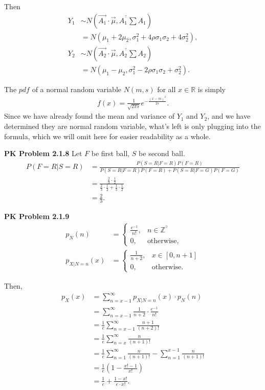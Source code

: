 \documentclass{article}
\begin{document}
Then 
\begin{align}
    Y_1 & \sim N(\vec{A_1}\cdot\vec{\mu}, A_1^{^\top}\sum A_1) \nonumber \\
    & = N(\mu_1+2\mu_2, \sigma_1^2+4\rho\sigma_1\sigma_2+4\sigma_2^2), \nonumber \\
    Y_2 & \sim N(\vec{A_2}\cdot\vec{\mu}, A_2^{^\top}\sum A_2) \nonumber \\
    & = N(\mu_1-\mu_2,\sigma_1^2-2\rho\sigma_1\sigma_2+\sigma_2^2). \nonumber
\end{align}

The $pdf$ of a normal random variable $N(m,s)$ for all $x \in \mathbb{R}$ is simply 
\begin{align}
    f(x) = \frac{1}{\sqrt{2\pi s}}e^{-\frac{(x-m)^2}{2s}}. \nonumber
\end{align}
Since we have already found the mean and variance of $Y_1$ and $Y_2$, and we have determined they are normal random variable, what's left is only plugging into the formula, which we will omit here for easier readability as a whole.
\bigbreak

\textbf{PK Problem 2.1.8} 
Let $F$ be first ball, $S$ be second ball.
\begin{align}
    P(F = R | S = R) & = \frac{P(S = R | F = R)P(F = R)}{P(S = R | F = R)P(F = R) + P(S = R | F = G)P(F = G)} \nonumber \\
    & = \frac{\frac{2}{3}\cdot\frac{1}{2}}{\frac{2}{3}\cdot\frac{1}{2} + \frac{1}{3}\cdot\frac{1}{2}} \nonumber \\
    & = \frac{2}{3}. \nonumber
\end{align}
\bigbreak

\textbf{PK Problem 2.1.9} 
\begin{align}
    p_N(n) & = \begin{cases}
        \frac{e^{-1}}{n!}, & n \in \mathbb{Z^{^\ge}}\nonumber \\
        0, & \text{otherwise}, \nonumber
    \end{cases} \\
    p_{X|N=n}(x) & = \begin{cases}
        \frac{1}{n+2}, & x \in [0,n+1] \nonumber \\
        0, & \text{otherwise}. \nonumber
    \end{cases}
\end{align}

Then, 
\begin{align}
    p_X(x) & = \sum_{n=x-1}^{\infty}p_{X|N=n}(x)\cdot p_N(n) \nonumber \\
    & = \sum_{n=x-1}^{\infty}\frac{1}{n+2} \cdot \frac{e^{-1}}{n!} \nonumber \\
    & = \frac{1}{e}\sum_{n=x-1}^{\infty}\frac{n+1}{(n+2)!} \nonumber \\
    & = \frac{1}{e}\sum_{n=x}^{\infty}\frac{n}{(n+1)!} \nonumber \\
    & = \frac{1}{e}\sum_{n=1}^{\infty}\frac{n}{(n+1)!} - \sum_{n=1}^{x-1}\frac{n}{(n+1)!} \nonumber \\
    & = \frac{1}{e}\left(1-\frac{x!-1}{x!}\right) \nonumber \\ 
    & = \frac{1}{e} + \frac{1-x!}{e\cdot x!}. \nonumber
\end{align}
\bigbreak
\end{document}
